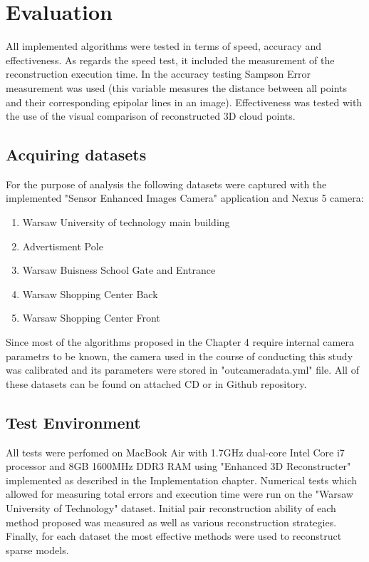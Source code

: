 
\ifpdf
    \graphicspath{{figures/}{figures/comparisons}}
\else
    \graphicspath{{figures/}{figures/comparisons}}
\fi


\chapter{Evaluation} %
All implemented algorithms were tested in terms of speed, accuracy and effectiveness. As regards the speed test, it included the measurement of the reconstruction execution time. In the accuracy testing Sampson Error measurement was used (this variable measures the distance between all points and their corresponding epipolar lines in an image). Effectiveness was tested with the use of the visual comparison of reconstructed 3D cloud points.
\section{Acquiring datasets}
For the purpose of analysis the following datasets were captured with the implemented "Sensor Enhanced Images Camera" application and Nexus 5 camera:
\begin{enumerate}
\item Warsaw University of technology main building
\item Advertisment Pole 
\item Warsaw Buisness School Gate and Entrance
\item Warsaw Shopping Center Back
\item Warsaw Shopping Center Front
\end{enumerate}
Since most of the algorithms proposed in the Chapter 4 require internal camera parametrs to be known, the camera used in the course of conducting this study was calibrated and its parameters were stored in "outcameradata.yml" file. All of these datasets can be found on attached CD or in Github repository.
\section{Test Environment}
All tests were perfomed on MacBook Air with 1.7GHz dual-core Intel Core i7 processor and 8GB 1600MHz DDR3 RAM using "Enhanced 3D Reconstructer" implemented as described in the Implementation chapter.  Numerical tests which allowed for measuring total errors and execution time were run on the "Warsaw University of Technology" dataset. Initial pair reconstruction ability of each method proposed was measured as well as various reconstruction strategies.  Finally, for each dataset the most effective methods were used to reconstruct sparse models. 
